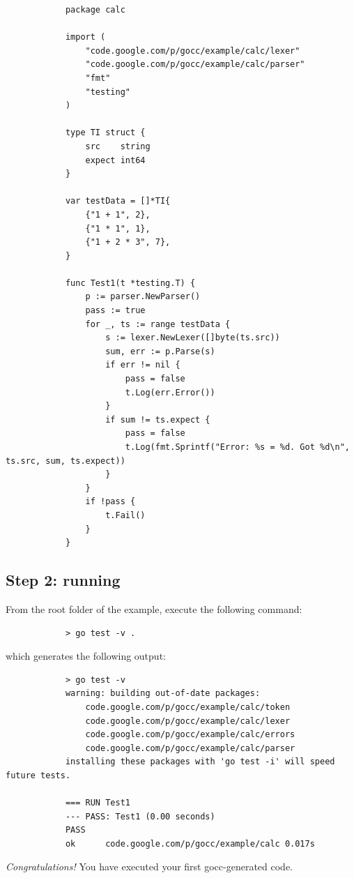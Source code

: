 \documentclass[12pt]{article}
\begin{document}
		\begin{verbatim}
			package calc

			import (
			    "code.google.com/p/gocc/example/calc/lexer"
			    "code.google.com/p/gocc/example/calc/parser"
			    "fmt"
			    "testing"
			)

			type TI struct {
			    src    string
			    expect int64
			}

			var testData = []*TI{
			    {"1 + 1", 2},
			    {"1 * 1", 1},
			    {"1 + 2 * 3", 7},
			}

			func Test1(t *testing.T) {
			    p := parser.NewParser()
			    pass := true
			    for _, ts := range testData {
			        s := lexer.NewLexer([]byte(ts.src))
			        sum, err := p.Parse(s)
			        if err != nil {
			            pass = false
			            t.Log(err.Error())
			        }
			        if sum != ts.expect {
			            pass = false
			            t.Log(fmt.Sprintf("Error: %s = %d. Got %d\n", ts.src, sum, ts.expect))
			        }
			    }
			    if !pass {
			        t.Fail()
			    }
			}
		\end{verbatim}

	\subsection{Step 2: running }
		From the root folder of the  example, execute the following command:

		\begin{verbatim}
			> go test -v .
		\end{verbatim}

		which generates the following output:

		\begin{verbatim}
			> go test -v
			warning: building out-of-date packages:
			    code.google.com/p/gocc/example/calc/token
			    code.google.com/p/gocc/example/calc/lexer
			    code.google.com/p/gocc/example/calc/errors
			    code.google.com/p/gocc/example/calc/parser
			installing these packages with 'go test -i' will speed future tests.

			=== RUN Test1
			--- PASS: Test1 (0.00 seconds)
			PASS
			ok      code.google.com/p/gocc/example/calc	0.017s
		\end{verbatim}

		{\em Congratulations!} You have executed your first gocc-generated code.
\end{document}
